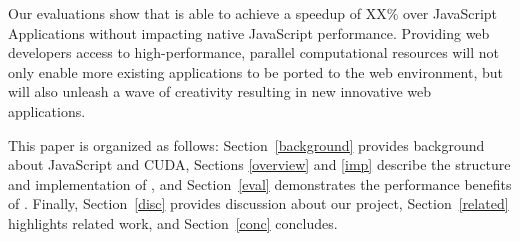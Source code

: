 Our evaluations show that \name is able to achieve a speedup of XX\% over
JavaScript Applications without impacting native JavaScript performance.
Providing web developers access to high-performance, parallel computational
resources will not only enable more existing applications to be ported to the
web environment, but will also unleash a wave of creativity resulting in new
innovative web applications.

This paper is organized as follows: Section~\ref{background} provides background
about JavaScript and CUDA, Sections \ref{overview} and \ref{imp} describe the
structure and implementation of \namens, and Section~\ref{eval} demonstrates the
performance benefits of \namens. Finally, Section~\ref{disc} provides discussion
about our project, Section~\ref{related} highlights related work, and
Section~\ref{conc} concludes.

